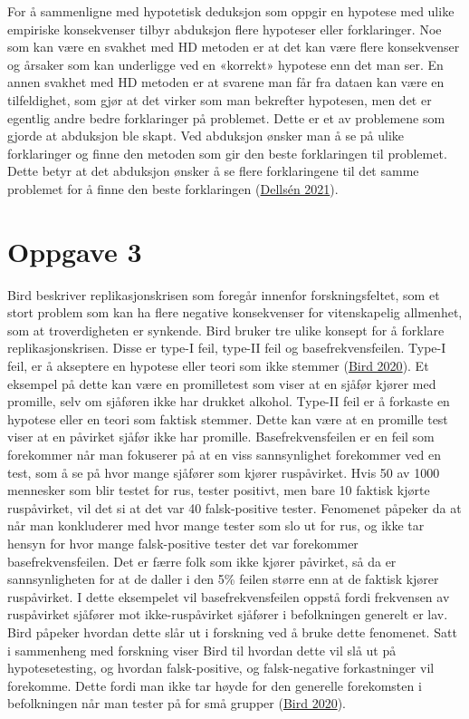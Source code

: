 \documentclass[
]{book}
\begin{document}
For å sammenligne med hypotetisk deduksjon som oppgir en hypotese med
ulike empiriske konsekvenser tilbyr abduksjon flere hypoteser eller
forklaringer. Noe som kan være en svakhet med HD metoden er at det kan
være flere konsekvenser og årsaker som kan underligge ved en «korrekt»
hypotese enn det man ser. En annen svakhet med HD metoden er at svarene
man får fra dataen kan være en tilfeldighet, som gjør at det virker som
man bekrefter hypotesen, men det er egentlig andre bedre forklaringer på
problemet. Dette er et av problemene som gjorde at abduksjon ble skapt.
Ved abduksjon ønsker man å se på ulike forklaringer og finne den metoden
som gir den beste forklaringen til problemet. Dette betyr at det
abduksjon ønsker å se flere forklaringene til det samme problemet for å
finne den beste forklaringen
(\protect\hyperlink{ref-dellsuxe9n2021}{Dellsén 2021}).

\hypertarget{oppgave-3}{%
\section{Oppgave 3}\label{oppgave-3}}

Bird beskriver replikasjonskrisen som foregår innenfor forskningsfeltet,
som et stort problem som kan ha flere negative konsekvenser for
vitenskapelig allmenhet, som at troverdigheten er synkende. Bird bruker
tre ulike konsept for å forklare replikasjonskrisen. Disse er type-I
feil, type-II feil og basefrekvensfeilen. Type-I feil, er å akseptere en
hypotese eller teori som ikke stemmer
(\protect\hyperlink{ref-bird2020}{Bird 2020}). Et eksempel på dette kan
være en promilletest som viser at en sjåfør kjører med promille, selv om
sjåføren ikke har drukket alkohol. Type-II feil er å forkaste en
hypotese eller en teori som faktisk stemmer. Dette kan være at en
promille test viser at en påvirket sjåfør ikke har promille.
Basefrekvensfeilen er en feil som forekommer når man fokuserer på at en
viss sannsynlighet forekommer ved en test, som å se på hvor mange
sjåfører som kjører ruspåvirket. Hvis 50 av 1000 mennesker som blir
testet for rus, tester positivt, men bare 10 faktisk kjørte ruspåvirket,
vil det si at det var 40 falsk-positive tester. Fenomenet påpeker da at
når man konkluderer med hvor mange tester som slo ut for rus, og ikke
tar hensyn for hvor mange falsk-positive tester det var forekommer
basefrekvensfeilen. Det er færre folk som ikke kjører påvirket, så da er
sannsynligheten for at de daller i den 5\% feilen større enn at de
faktisk kjører ruspåvirket. I dette eksempelet vil basefrekvensfeilen
oppstå fordi frekvensen av ruspåvirket sjåfører mot ikke-ruspåvirket
sjåfører i befolkningen generelt er lav. Bird påpeker hvordan dette slår
ut i forskning ved å bruke dette fenomenet. Satt i sammenheng med
forskning viser Bird til hvordan dette vil slå ut på hypotesetesting, og
hvordan falsk-positive, og falsk-negative forkastninger vil forekomme.
Dette fordi man ikke tar høyde for den generelle forekomsten i
befolkningen når man tester på for små grupper
(\protect\hyperlink{ref-bird2020}{Bird 2020}).
\end{document}
